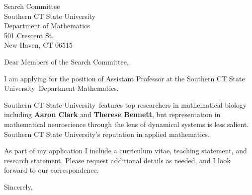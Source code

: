 \documentclass[11pt,a4paper]{letter}
\begin{document}

\def\School{Southern CT State University}

\begin{letter}
{Search Committee\\
Southern CT State University\\
Department of Mathematics\\
501 Crescent St.\\
New Haven, CT 06515}


\opening{Dear Members of the Search Committee,}

I am applying for the position of Assistant Professor at the \School~Department Mathematics. 



\School~features top researchers in mathematical biology including \textbf{Aaron Clark} and \textbf{Therese Bennett}, but representation in mathematical neuroscience through the lens of dynamical systems is less salient. \School's reputation in applied mathematics.



As part of my application I include a curriculum vitae, teaching statement, and research statement. Please request additional details as needed, and I look forward to our correspondence.

\closing{Sincerely,}
\end{letter}
\end{document}
